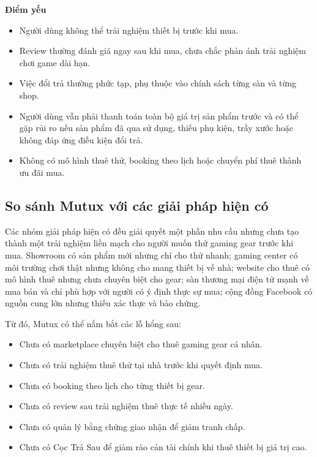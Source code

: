 \textbf{Điểm yếu}
\begin{itemize}
    \item Người dùng không thể trải nghiệm thiết bị trước khi mua.
    \item Review thường đánh giá ngay sau khi mua, chưa chắc phản ánh trải nghiệm chơi game dài hạn.
    \item Việc đổi trả thường phức tạp, phụ thuộc vào chính sách từng sàn và từng shop.
    \item Người dùng vẫn phải thanh toán toàn bộ giá trị sản phẩm trước và có thể gặp rủi ro nếu sản phẩm đã qua sử dụng, thiếu phụ kiện, trầy xước hoặc không đáp ứng điều kiện đổi trả.
    \item Không có mô hình thuê thử, booking theo lịch hoặc chuyển phí thuê thành ưu đãi mua.
\end{itemize}




\subsection{So sánh Mutux với các giải pháp hiện có}
Các nhóm giải pháp hiện có đều giải quyết một phần nhu cầu nhưng chưa tạo thành một trải nghiệm liền mạch cho người muốn thử gaming gear trước khi mua. Showroom có sản phẩm mới nhưng chỉ cho thử nhanh; gaming center có môi trường chơi thật nhưng không cho mang thiết bị về nhà; website cho thuê có mô hình thuê nhưng chưa chuyên biệt cho gear; sàn thương mại điện tử mạnh về mua bán và chỉ phù hợp với người có ý định thực sự mua; cộng đồng Facebook có nguồn cung lớn nhưng thiếu xác thực và bảo chứng.

Từ đó, Mutux có thể nắm bắt các lỗ hổng sau:

\begin{itemize}
    \item Chưa có marketplace chuyên biệt cho thuê gaming gear cá nhân.
    \item Chưa có trải nghiệm thuê thử tại nhà trước khi quyết định mua.
    \item Chưa có booking theo lịch cho từng thiết bị gear.
    \item Chưa có review sau trải nghiệm thuê thực tế nhiều ngày.
    \item Chưa có quản lý bằng chứng giao nhận để giảm tranh chấp.
    \item Chưa có Cọc Trả Sau để giảm rào cản tài chính khi thuê thiết bị giá trị cao.
\end{itemize}

